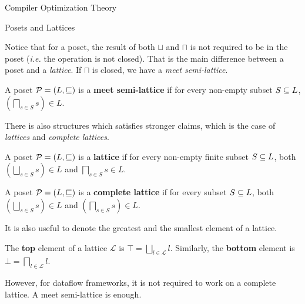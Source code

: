 \begin{section}{Compiler Optimization Theory}
\begin{subsection}{Posets and Lattices}
%

Notice that for a poset, the result of both $\sqcup$ and $\sqcap$ is not
required to be in the poset (\textit{i.e.} the operation is not closed).
That is the main difference between a poset and a \textit{lattice}.
If $\sqcap$ is closed, we have a \textit{meet semi-lattice}.

\begin{definition}
	A poset $\mathcal{P} = (L, \sqsubseteq)$ is a \textbf{meet semi-lattice} if
	for every non-empty subset $S \subseteq L$, $\left(\bigsqcap_{s \in S} s \right) \in L$.
\end{definition}

There is also structures which satisfies stronger claims, which is the case
of \textit{lattices} and \textit{complete lattices}.

\begin{definition}
	A poset $\mathcal{P} = (L, \sqsubseteq)$ is a \textbf{lattice} if for every
	non-empty finite subset $S \subseteq L$, both $\left(\bigsqcup_{s \in S} s\right) \in L$
	and $\bigsqcap_{s \in S} s \in L$.
\end{definition}

\begin{definition}
	A poset $\mathcal{P} = (L, \sqsubseteq)$ is a \textbf{complete lattice} if
	for every subset $S \subseteq L$, both $\left( \bigsqcup_{s \in S} s \right) \in L$
	and $\left(\bigsqcap_{s \in S} s \right) \in L$.
\end{definition}

It is also useful to denote the greatest and the smallest element of a lattice.

\begin{definition}
	The \textbf{top} element of a lattice $\mathcal{L}$ is $\top = \bigsqcup_{l \in \mathcal{L}} l$. Similarly, the \textbf{bottom} element is $\bot = \bigsqcap_{l \in \mathcal{L}} l$.
\end{definition}

However, for dataflow frameworks, it is not required to work on a complete
lattice. A meet semi-lattice is enough.


\end{subsection}
\end{section}
